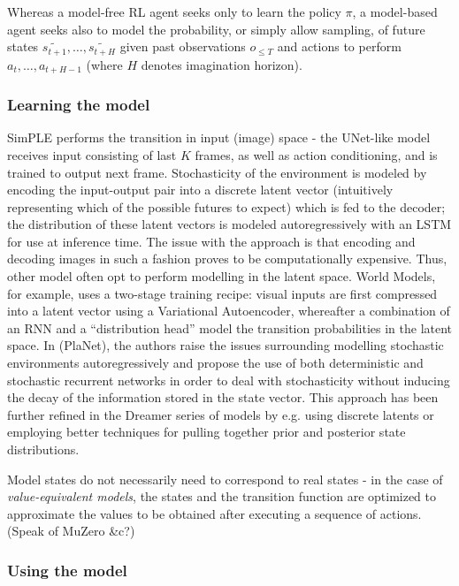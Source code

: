 \documentclass[twoside,11pt]{article}
\begin{document}
Whereas a model-free RL agent seeks only to learn the policy $\pi$, a model-based agent seeks also to model the probability, or simply allow sampling, of future states $\widetilde{s_{t+1}}, \ldots, \widetilde{s_{t+H}}$ given past observations $o_{\leq T}$ and actions to perform $a_{t}, \ldots, a_{t+H-1}$ (where $H$ denotes imagination horizon).

\subsubsection{Learning the model}

SimPLE performs the transition in input (image) space - the UNet-like model receives input consisting of last $K$ frames, as well as action conditioning, and is trained to output next frame. Stochasticity of the environment is modeled by encoding the input-output pair into a discrete latent vector (intuitively representing which of the possible futures to expect) which is fed to the decoder; the distribution of these latent vectors is modeled autoregressively with an LSTM for use at inference time. The issue with the approach is that encoding and decoding images in such a fashion proves to be computationally expensive. Thus, other model often opt to perform modelling in the latent space. World Models, for example, uses a two-stage training recipe: visual inputs are first compressed into a latent vector using a Variational Autoencoder, whereafter a combination of an RNN and a ``distribution head'' model the transition probabilities in the latent space. In (PlaNet), the authors raise the issues surrounding modelling stochastic environments autoregressively and propose the use of both deterministic and stochastic recurrent networks in order to deal with stochasticity without inducing the decay of the information stored in the state vector. This approach has been further refined in the Dreamer series of models by e.g. using discrete latents or employing better techniques for pulling together prior and posterior state distributions.

Model states do not necessarily need to correspond to real states - in the case of \emph{value-equivalent models}, the states and the transition function are optimized to approximate the values to be obtained after executing a sequence of actions. (Speak of MuZero \&c?)

\subsubsection{Using the model}
\end{document}

